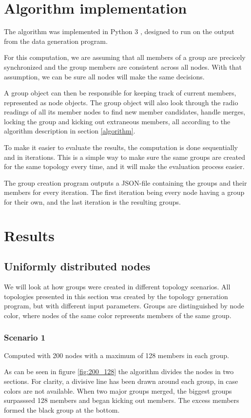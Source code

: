 \section{Algorithm implementation}
The algorithm was implemented in Python 3 \cite{Python3}, designed to run on the output from 
the data generation program.

For this computation, we are assuming that all members of a group are precicely synchronized
and the group members are consistent across all nodes. With that assumption, we can be sure
all nodes will make the same decisions. 

A group object can then be responsible for keeping track of current members,
represented as node objects. The group object will also look through the radio readings
of all its member nodes to find new member candidates, handle merges, locking the group and
kicking out extraneous members, all according to the algorithm description in section
\ref{algorithm}.


To make it easier to evaluate the results, the computation is done sequentially
and in iterations. This is a simple way to make sure the same groups are created 
for the same topology every time, and it will make the evaluation process easier. 

The group creation program outputs a JSON-file containing the groups and their members for every iteration. The first iteration being every node having a group for their own,
and the last iteration is the resulting groups.
\section{Results}

\subsection{Uniformly distributed nodes}
We will look at how groups were created in different topology scenarios. 
All topologies presented in this section was created by the topology generation program,
but with different input parameters. Groups are distinguished by node color, where nodes
of the same color represents members of the same group. 
\subsubsection{Scenario 1}
Computed with 200 nodes with a maximum of 128 members in each group.

As can be seen in figure \ref{fig:200_128} the algorithm divides the nodes in two
sections. For clarity, a divisive line has been drawn around each group,
in case colors are not available.
When two major groups merged, the biggest groups surpasssed 128 members and began
kicking out members. The excess members formed the black group at the bottom. 

